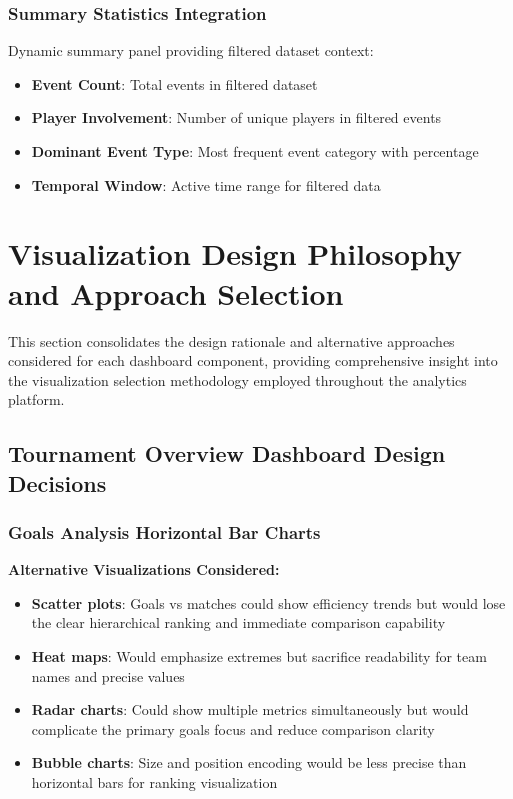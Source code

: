 \documentclass[12pt,a4paper]{article}
\begin{document}
\subsubsection{Summary Statistics Integration}
Dynamic summary panel providing filtered dataset context:
\begin{itemize}
    \item \textbf{Event Count}: Total events in filtered dataset
    \item \textbf{Player Involvement}: Number of unique players in filtered events
    \item \textbf{Dominant Event Type}: Most frequent event category with percentage
    \item \textbf{Temporal Window}: Active time range for filtered data
\end{itemize}




\section{Visualization Design Philosophy and Approach Selection}
\label{sec:design_philosophy}

This section consolidates the design rationale and alternative approaches considered for each dashboard component, providing comprehensive insight into the visualization selection methodology employed throughout the analytics platform.

\subsection{Tournament Overview Dashboard Design Decisions}

\subsubsection{Goals Analysis Horizontal Bar Charts}
\textbf{Alternative Visualizations Considered:}
\begin{itemize}
    \item \textbf{Scatter plots}: Goals vs matches could show efficiency trends but would lose the clear hierarchical ranking and immediate comparison capability
    \item \textbf{Heat maps}: Would emphasize extremes but sacrifice readability for team names and precise values
    \item \textbf{Radar charts}: Could show multiple metrics simultaneously but would complicate the primary goals focus and reduce comparison clarity
    \item \textbf{Bubble charts}: Size and position encoding would be less precise than horizontal bars for ranking visualization
\end{itemize}
\end{document}

